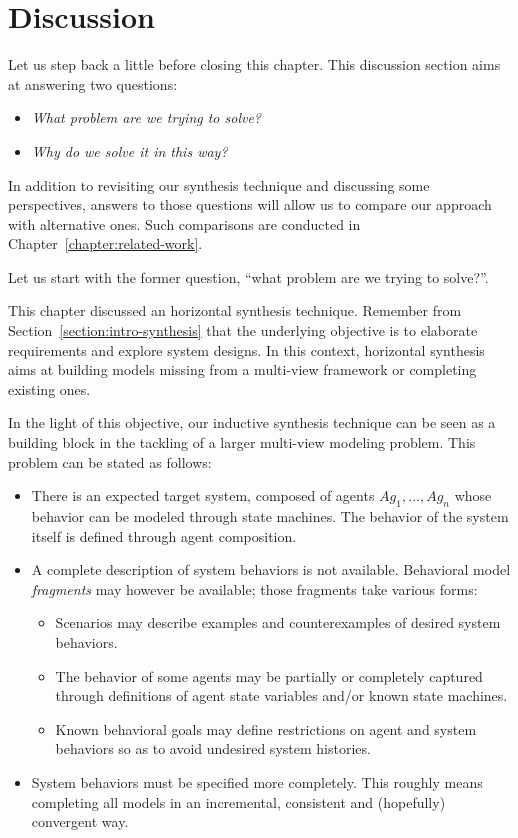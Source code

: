 \section{Discussion\label{section:inductive-discussion}}

Let us step back a little before closing this chapter. This discussion section aims at answering two questions:
\begin{itemize}
\item \emph{What problem are we trying to solve?}
\item \emph{Why do we solve it in this way?}
\end{itemize}
In addition to revisiting our synthesis technique and discussing some perspectives, answers to those questions will allow us to compare our approach with alternative ones. Such comparisons are conducted in Chapter~\ref{chapter:related-work}. 

Let us start with the former question, ``what problem are we trying to solve?''. 

This chapter discussed an horizontal synthesis technique. Remember from Section~\ref{section:intro-synthesis} that the underlying objective is to elaborate requirements and explore system designs. In this context, horizontal synthesis aims at building models missing from a multi-view framework or completing existing ones.

In the light of this objective, our inductive synthesis technique can be seen as a building block in the tackling of a larger multi-view modeling problem. This problem can be stated as follows:
\begin{itemize}
\item There is an expected target system, composed of agents $Ag_1, \ldots, Ag_n$ whose behavior can be modeled through state machines. The behavior of the system itself is defined through agent composition.
\item A complete description of system behaviors is not available. Behavioral model \emph{fragments} may however be available; those fragments take various forms:
\begin{itemize}
\item Scenarios may describe examples and counterexamples of desired system behaviors.
\item The behavior of some agents may be partially or completely captured through definitions of agent state variables and/or known state machines.
\item Known behavioral goals may define restrictions on agent and system behaviors so as to avoid undesired system histories.
\end{itemize}
\item System behaviors must be specified more completely. This roughly means completing all models in an incremental, consistent and (hopefully) convergent way.
\end{itemize}

